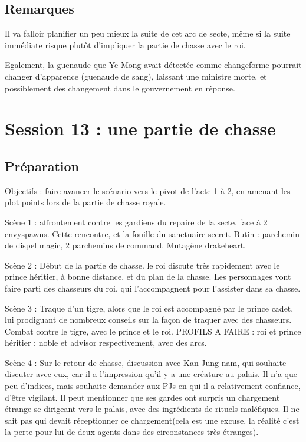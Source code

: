 \documentclass[10pt,a4paper]{book}
\begin{document}
\subsection{Remarques}
Il va falloir planifier un peu mieux la suite de cet arc de secte, même si la suite immédiate risque plutôt d'impliquer la partie de chasse avec le roi.

Egalement, la guenaude que Ye-Mong avait détectée comme changeforme pourrait changer d'apparence (guenaude de sang), laissant une ministre morte, et possiblement des changement dans le gouvernement en réponse.
\section{Session 13 : une partie de chasse}
\subsection{Préparation}
Objectifs : faire avancer le scénario vers le pivot de l'acte 1 à 2, en amenant les plot points lors de la partie de chasse royale.

Scène 1 : affrontement contre les gardiens du repaire de la secte, face à 2 envyspawns. Cette rencontre, et la fouille du sanctuaire secret. Butin :  parchemin de dispel magic, 2 parchemins de command. Mutagène drakeheart. 

Scène 2 : Début de la partie de chasse. le roi discute très rapidement avec le prince héritier, à bonne distance, et du plan de la chasse. Les personnages vont faire parti des chasseurs du roi, qui l'accompagnent pour l'assister dans sa chasse.

Scène 3 : Traque d'un tigre, alors que le roi est accompagné par le prince cadet, lui prodiguant de nombreux conseils sur la façon de traquer avec des chasseurs. Combat contre le tigre, avec le prince et le roi. PROFILS A FAIRE : roi et prince héritier : noble et advisor respectivement, avec des arcs.

Scène 4 : Sur le retour de chasse, discussion avec Kan Jung-nam, qui souhaite discuter avec eux, car il a l'impression qu'il y a une créature au palais. Il n'a que peu d'indices, mais souhaite demander aux PJs en qui il a relativement confiance, d'être vigilant. Il peut mentionner que ses gardes ont surpris un chargement étrange se dirigeant vers le palais, avec des ingrédients de rituels maléfiques. Il ne sait pas qui devait réceptionner ce chargement(cela est une excuse, la réalité c'est la perte pour lui de deux agents dans des circonstances très étranges).
\end{document}
